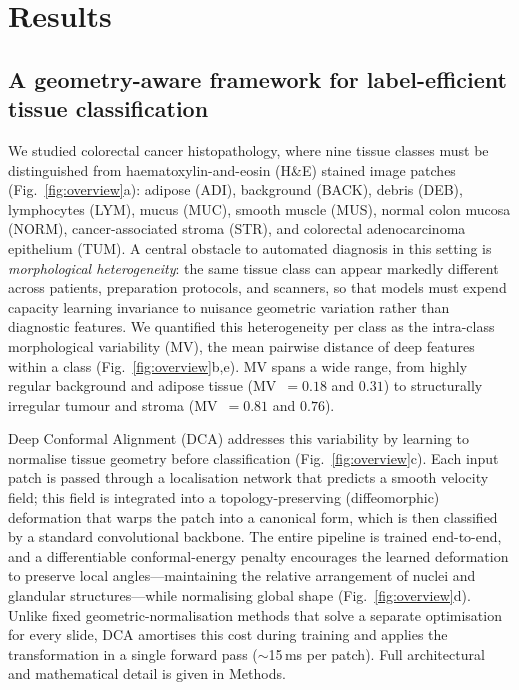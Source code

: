 
\section{Results}
\label{sec:results}

\subsection{A geometry-aware framework for label-efficient tissue classification}

We studied colorectal cancer histopathology, where nine tissue classes must be
distinguished from haematoxylin-and-eosin (H\&E) stained image patches
(Fig.~\ref{fig:overview}a): adipose (ADI), background (BACK), debris (DEB),
lymphocytes (LYM), mucus (MUC), smooth muscle (MUS), normal colon mucosa
(NORM), cancer-associated stroma (STR), and colorectal adenocarcinoma
epithelium (TUM). A central obstacle to automated diagnosis in this setting is
\textit{morphological heterogeneity}: the same tissue class can appear markedly
different across patients, preparation protocols, and scanners, so that models
must expend capacity learning invariance to nuisance geometric variation rather
than diagnostic features. We quantified this heterogeneity per class as the
intra-class morphological variability (MV), the mean pairwise distance of
deep features within a class (Fig.~\ref{fig:overview}b,e). MV spans a wide range,
from highly regular background and adipose tissue (MV~$=0.18$ and $0.31$) to
structurally irregular tumour and stroma (MV~$=0.81$ and $0.76$).

Deep Conformal Alignment (DCA) addresses this variability by learning to
normalise tissue geometry before classification (Fig.~\ref{fig:overview}c).
Each input patch is passed through a localisation network that predicts a
smooth velocity field; this field is integrated into a topology-preserving
(diffeomorphic) deformation that warps the patch into a canonical form, which is
then classified by a standard convolutional backbone. The entire pipeline is
trained end-to-end, and a differentiable conformal-energy penalty encourages the
learned deformation to preserve local angles---maintaining the relative
arrangement of nuclei and glandular structures---while normalising global shape
(Fig.~\ref{fig:overview}d). Unlike fixed geometric-normalisation methods that
solve a separate optimisation for every slide, DCA amortises this cost during
training and applies the transformation in a single forward pass
($\sim$15\,ms per patch). Full architectural and mathematical detail is given in
Methods.

